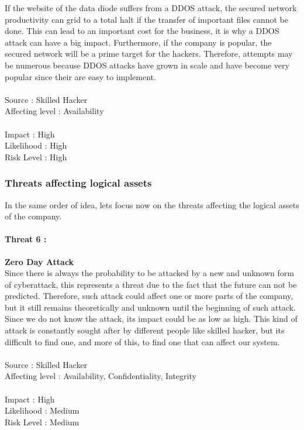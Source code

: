 \documentclass[a4paper,10pt]{article}
\begin{document}
If the website of the data diode suffers from a DDOS attack, the secured network productivity can grid to a total halt if the transfer of important files cannot be done. This can lead to an important cost for the business, it is why a DDOS attack can have a big impact. Furthermore, if the company is popular, the secured network will be a prime target for the hackers. Therefore, attempts may be numerous because DDOS attacks have grown in scale and have become very popular since their are easy to implement.\\ \\
Source : Skilled Hacker \\ 
Affecting level : Availability  \\ \\
Impact : High \\
Likelihood : High \\
Risk Level : High


\subsubsection{Threats affecting logical assets}
In the same order of idea, lets focus now on the threats affecting the logical assets of the company. 

\paragraph{Threat 6 :}  \textbf{Zero Day Attack} \\
\indent Since there is always the probability to be attacked by a new and unknown form of cyberattack, this represents a threat due to the fact that the future can not be predicted. Therefore, such attack could affect one or more parts of the company, but it still remains theoretically and unknown until the beginning of such attack.
Since we do not know the attack, its impact could be as low as high. This kind of attack is constantly sought after by different people like skilled hacker, but its difficult to find one, and more of this, to find one that can affect our system. \\ \\
Source : Skilled Hacker \\ 
Affecting level : Availability, Confidentiality, Integrity  \\ \\
Impact : High \\
Likelihood : Medium \\
Risk Level : Medium
\end{document}
